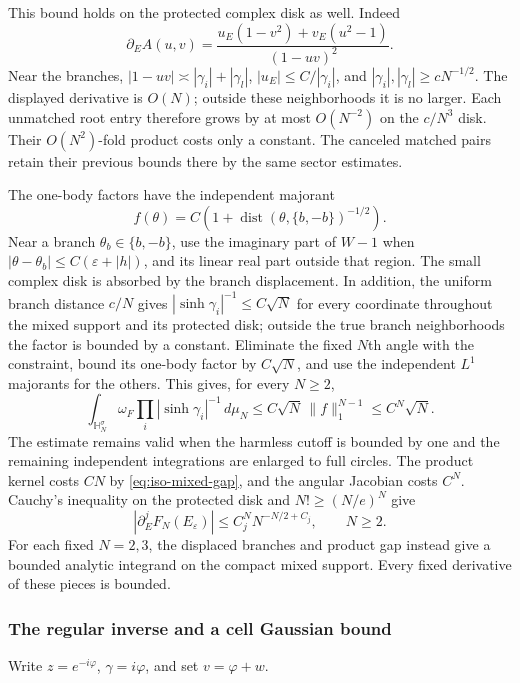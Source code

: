 \documentclass[11pt]{article}
\numberwithin{equation}{section}
\theoremstyle{definition}
\newcommand{\eps}{\varepsilon}
\begin{document}
This bound holds on the protected complex disk as well.  Indeed
\[
 \partial_{{E}}A(u,v)
 =\frac{u_{{E}}(1-v^2)+v_{{E}}(u^2-1)}{(1-uv)^2}.
\]
Near the branches, $|1-uv|\asymp|\gamma_i|+|\gamma_l|$,
$|u_{{E}}|\le C/|\gamma_i|$, and
$|\gamma_i|,|\gamma_l|\ge cN^{-1/2}$.  The displayed derivative
is $O(N)$; outside these neighborhoods it is no larger.
Each unmatched root entry therefore grows by at most $O(N^{-2})$
on the $c/N^3$ disk.  Their $O(N^2)$-fold product costs only a
constant.  The canceled matched pairs retain their previous bounds
there by the same sector estimates.

The one-body factors have the independent majorant
\[
 f(\theta)=C\left(1+
       \operatorname{dist}(\theta,\{b,-b\})^{-1/2}\right).
\]
Near a branch $\theta_b\in\{b,-b\}$, use the imaginary part of
$W-1$ when $|\theta-\theta_b|\le C(\eps+|h|)$, and its linear
real part outside that region.  The small
complex disk is absorbed by the branch displacement.  In addition,
the uniform branch distance $c/N$ gives
$|\sinh\gamma_i|^{-1}\le C\sqrt N$ for every coordinate throughout
the mixed support and its protected disk; outside the true branch
neighborhoods the factor is bounded by a constant.  Eliminate the
fixed $N$th angle with the constraint, bound its one-body factor by
$C\sqrt N$, and use the independent $L^1$ majorants for the others.
This gives, for every $N\ge2$,
\[
 \int_{\mathbb H_N^\sigma}\omega_F
       \prod_i|\sinh\gamma_i|^{-1}\,d\mu_N
       \le C\sqrt N\,\|f\|_1^{N-1}\le C^N\sqrt N .
\]
The estimate remains valid when the harmless cutoff is bounded by one
and the remaining independent integrations are enlarged to full circles.
The product kernel costs
$CN$ by \eqref{eq:iso-mixed-gap}, and the angular Jacobian costs
$C^N$.  Cauchy's inequality on the protected disk and $N!\ge(N/e)^N$
give
\begin{equation}\label{eq:iso-mixed-jets}
 |\partial_{{E}}^j F_N({E}_\eps)|
       \le C_j^N N^{-N/2+C_j},\qquad N\ge2.
\end{equation}
For each fixed $N=2,3$, the displaced branches and product gap instead
give a bounded analytic integrand on the compact mixed support.
Every fixed derivative of these pieces is bounded.

\subsubsection{The regular inverse and a cell Gaussian bound}

Write $z=e^{-i\varphi}$, $\gamma=i\varphi$, and set $v=\varphi+w$.
\end{document}
